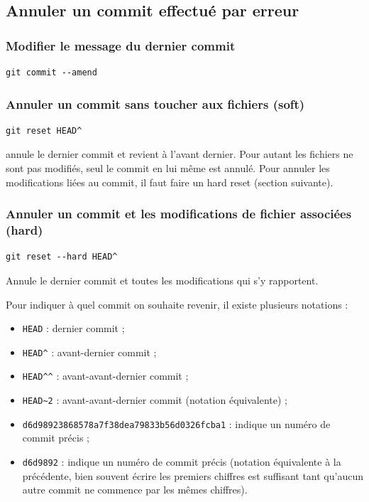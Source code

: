 \documentclass[a4paper,twoside]{article}
\begin{document}
\subsection{Annuler un commit effectué par erreur}
\subsubsection{Modifier le message du dernier commit}
\begin{verbatim}
git commit --amend
\end{verbatim}

\subsubsection{Annuler un commit sans toucher aux fichiers (soft)}
\begin{verbatim}
git reset HEAD^
\end{verbatim}
annule le dernier commit et revient à l'avant dernier. Pour autant les fichiers ne sont pas modifiés, seul le commit en lui même est annulé. Pour annuler les modifications liées au commit, il faut faire un hard reset (section suivante).


\subsubsection{Annuler un commit et les modifications de fichier associées (hard)}
\begin{verbatim}
git reset --hard HEAD^
\end{verbatim}
Annule le dernier commit et toutes les modifications qui s'y rapportent. 

Pour indiquer à quel commit on souhaite revenir, il existe plusieurs notations :
\begin{itemize}
\item \verb|HEAD| : dernier commit ;
\item \verb|HEAD^| : avant-dernier commit ;
\item \verb|HEAD^^| : avant-avant-dernier commit ;
\item \verb|HEAD~2| : avant-avant-dernier commit (notation équivalente) ;
\item \verb|d6d98923868578a7f38dea79833b56d0326fcba1| : indique un numéro de commit précis ;
\item \verb|d6d9892| : indique un numéro de commit précis (notation équivalente à la précédente, bien souvent écrire les premiers chiffres est suffisant tant qu'aucun autre commit ne commence par les mêmes chiffres).
\end{itemize}
\end{document}
